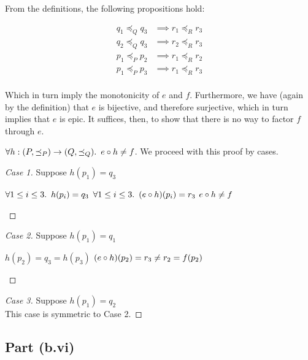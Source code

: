 From the definitions, the following propositions hold:

\begin{align*}
  q_1 \preceq_Q q_3 & \implies r_1 \preceq_R r_3 \\
  q_2 \preceq_Q q_3 & \implies r_2 \preceq_R r_3 \\
  p_1 \preceq_P p_2 & \implies r_1 \preceq_R r_2 \\
  p_1 \preceq_P p_3 & \implies r_1 \preceq_R r_3 \\
\end{align*}

Which in turn imply the monotonicity of $e$ and $f$. Furthermore, we have (again by the definition) that $e$ is bijective, and therefore surjective, which in turn implies that $e$ is epic. It suffices, then, to show that there is no way to factor $f$ through $e$.

\begin{prop}
  $\forall h : (P,\preceq_P)\to(Q,\preceq_Q)\ldotp~e\circ h \neq f$. We proceed with this proof by cases.

  \begin{proof}[Case 1]
    Suppose $h(p_1) = q_3$
    \begin{itemize}
      \step[\imps] $\forall 1\leq i\leq 3\ldotp~h(p_i) = q_3$
      \step[\imps] $\forall 1\leq i\leq 3\ldotp~(e\circ h)(p_i) = r_3$
      \step[\imps] $e\circ h\neq f$
        \qedhere
    \end{itemize}
  \end{proof}

  \begin{proof}[Case 2]
    Suppose $h(p_1) = q_1$
    \begin{itemize}
      \step[\imps] $h(p_2) = q_3 = h(p_3)$
      \step[\imps] $(e\circ h)(p_2) = r_3 \neq r_2 = f(p_2)$
        \qedhere
    \end{itemize}
  \end{proof}

  \begin{proof}[Case 3]
    Suppose $h(p_1) = q_2$\\
    This case is symmetric to Case 2.\qedhere
  \end{proof}
\end{prop}

\subsection{Part (b.vi)}\label{sec:q-1-b-vi}

